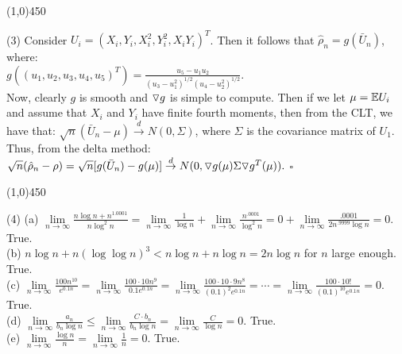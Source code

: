 \documentclass[12pt]{article}
\begin{document}
\begin{center}
\line(1,0){450}
\end{center}


\noindent
(3) Consider $U_i = (X_i,Y_i,X_i^2,Y_i^2,X_iY_i)^T$. Then it follows that $\hat{\rho}_n = g(\bar{U}_n)$, where:\\

\noindent
\indent $g((u_1,u_2,u_3,u_4,u_5)^T) = \frac{u_5-u_1u_2}{(u_3-u_1^2)^{1/2}(u_4-u_2^2)^{1/2}}$.\\

\noindent
Now, clearly $g$ is smooth and $\triangledown g$ is simple to compute. Then if we let $\mu = \mathbb{E} U_i$ and assume that $X_i$ and $Y_i$ have finite fourth moments, then from the CLT, we have that:
$\sqrt{n}(\bar{U}_n-\mu) \overset{d}\to N(0,\Sigma)$,
where $\Sigma$ is the covariance matrix of $U_1$.\\

\noindent
Thus, from the delta method: $\sqrt{n}(\hat{\rho}_n-\rho) = \sqrt{n} [g(\bar{U}_n)-g(\mu)] \overset{d}\to N(0,\triangledown g(\mu) \Sigma \triangledown g^T(\mu)).$ $\square$

\begin{center}
\line(1,0){450}
\end{center}


\noindent
(4) (a) $\lim\limits_{n\to\infty} \frac{n \log n + n^{1.0001}}{n \log^2 n} 
=\lim\limits_{n\to\infty} \frac{1}{\log n}+\lim\limits_{n\to\infty} \frac{n^{.0001}}{\log^2 n}
=0+ \lim\limits_{n\to\infty} \frac{.0001}{2 n^{.9999}\log n} = 0$. True.\\

(b) $n \log n + n(\log \log n)^3 < n \log n + n \log n = 2 n \log n$ for $n$ large enough. True.\\

(c) $\lim\limits_{n\to\infty} \frac{100n^{10}}{e^{0.1n}} = \lim\limits_{n\to\infty} \frac{100\cdot 10 n^{9}}{0.1e^{0.1n}} 
= \lim\limits_{n\to\infty} \frac{100\cdot 10 \cdot 9 n^{8}}{(0.1)^2e^{0.1n}}
= \cdots = \lim\limits_{n\to\infty} \frac{100\cdot 10!}{(0.1)^{10}e^{0.1n}} = 0.$ True.\\

(d) $\lim\limits_{n\to\infty} \frac{a_n}{b_n \log n} 
\leq \lim\limits_{n\to\infty} \frac{C\cdot b_n}{b_n \log n}
= \lim\limits_{n\to\infty} \frac{C}{\log n} = 0.$ True.\\

(e) $\lim\limits_{n\to\infty} \frac{\log n}{n} = \lim\limits_{n\to\infty} \frac{1}{n} = 0$. True.\\
\end{document}
